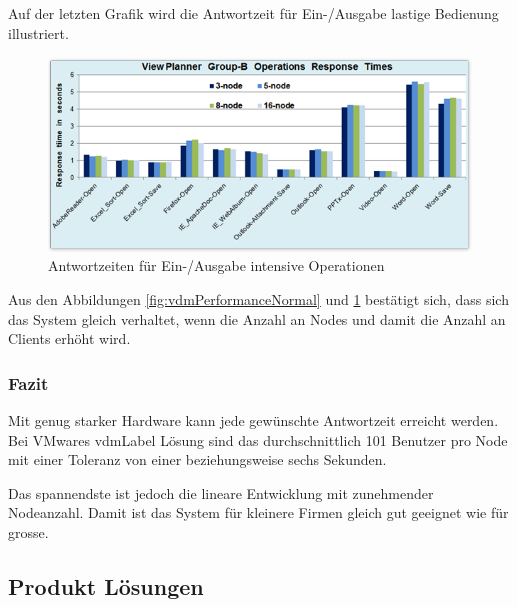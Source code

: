 Auf der letzten Grafik wird die Antwortzeit für Ein-/Ausgabe lastige Bedienung illustriert.
\begin{figure}[H]
	\includegraphics[width=\textwidth]{images/vmware-vdm-performance-io}
	\caption{Antwortzeiten für Ein-/Ausgabe intensive Operationen}
	\label{fig:vdmPerformanceIo}
\end{figure}

Aus den Abbildungen \ref{fig:vdmPerformanceNormal} und \ref{fig:vdmPerformanceIo} bestätigt sich, dass sich das System gleich verhaltet, wenn die Anzahl an Nodes und damit die Anzahl an Clients erhöht wird.

\subsubsection{Fazit}
Mit genug starker Hardware kann jede gewünschte Antwortzeit erreicht werden. Bei VMwares \Gls{vdmLabel} Lösung sind das durchschnittlich 101 Benutzer pro Node mit einer Toleranz von einer beziehungsweise sechs Sekunden.

Das spannendste ist jedoch die lineare Entwicklung mit zunehmender Nodeanzahl. Damit ist das System für kleinere Firmen gleich gut geeignet wie für grosse.

\subsection{Produkt Lösungen}





